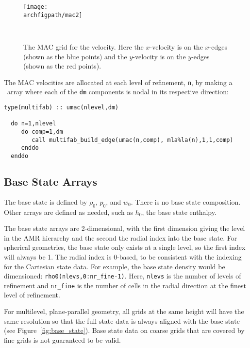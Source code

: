 \begin{figure}[t]
\centering
\texttt{[image: \\archfigpath/mac2]}
\hspace{0.1in}
\begin{minipage}[b]{3.8in}
\caption[The MAC grid]
{\label{fig:mac} The MAC grid for the velocity.  
Here the $x$-velocity is on the $x$-edges (shown as the 
blue points) and the $y$-velocity is on the $y$-edges
(shown as the red points).
}\ \\
\end{minipage}
\end{figure}

The MAC velocities are allocated at each level of refinement, {\tt n},
by making a \multifab\ array where each of the {\tt dm} components is
nodal in its respective direction:
\begin{lstlisting}[language={[95]fortran},mathescape=false]
  type(multifab) :: umac(nlevel,dm)

  do n=1,nlevel
     do comp=1,dm
        call multifab_build_edge(umac(n,comp), mla%la(n),1,1,comp)
     enddo
  enddo
\end{lstlisting}



\subsection{Base State Arrays}

The base state is defined by $\rho_0$, $p_0$, and $w_0$.  There is no
base state composition.  Other arrays are defined as needed, such as
$h_0$, the base state enthalpy.

The base state arrays are 2-dimensional, with the first dimension
giving the level in the AMR hierarchy and the second the radial index
into the base state.  For spherical geometries, the base state only
exists at a single level, so the first index will always be 1.  The
radial index is 0-based, to be consistent with the indexing for the
Cartesian state data.  For example, the base state density would be
dimensioned: {\tt rho0(nlevs,0:nr\_fine-1)}.  Here, {\tt nlevs} is the
number of levels of refinement and {\tt nr\_fine} is the number of
cells in the radial direction at the finest level of refinement.

For multilevel, plane-parallel geometry, all grids at the same height
will have the same resolution so that the full state data is always
aligned with the base state (see Figure~\ref{fig:base_state}).  Base
state data on coarse grids that are covered by fine grids is not
guaranteed to be valid.

